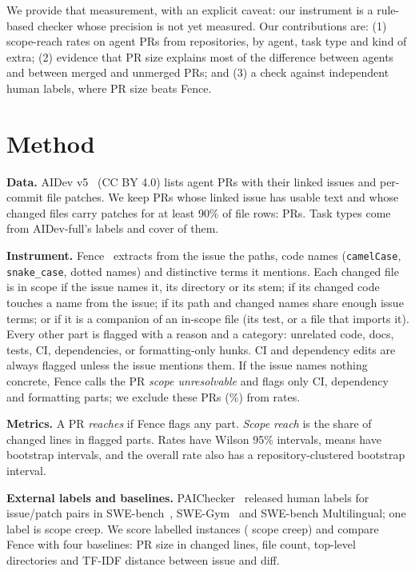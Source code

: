\documentclass[10pt,conference]{IEEEtran}
\begin{document}
We provide that measurement, with an explicit caveat: our instrument is a rule-based checker whose precision is not yet measured. Our contributions are: (1) scope-reach rates on \nCorpus{} agent PRs from \nRepos{} repositories, by agent, task type and kind of extra; (2) evidence that PR size explains most of the difference between agents and between merged and unmerged PRs; and (3) a check against independent human labels, where PR size beats Fence.

\section{Method}
\textbf{Data.} AIDev v5~\cite{li2026aidev} (CC BY 4.0) lists agent PRs with their linked issues and per-commit file patches. We keep PRs whose linked issue has usable text and whose changed files carry patches for at least 90\% of file rows: \nCorpus{} PRs. Task types come from AIDev-full's labels and cover \nTyped{} of them.

\textbf{Instrument.} Fence~\cite{fencetool} extracts from the issue the paths, code names (\texttt{camelCase}, \texttt{snake\_case}, dotted names) and distinctive terms it mentions. Each changed file is in scope if the issue names it, its directory or its stem; if its changed code touches a name from the issue; if its path and changed names share enough issue terms; or if it is a companion of an in-scope file (its test, or a file that imports it). Every other part is flagged with a reason and a category: unrelated code, docs, tests, CI, dependencies, or formatting-only hunks. CI and dependency edits are always flagged unless the issue mentions them. If the issue names nothing concrete, Fence calls the PR \emph{scope unresolvable} and flags only CI, dependency and formatting parts; we exclude these \nUnres{} PRs (\pctUnres\%) from rates.

\textbf{Metrics.} A PR \emph{reaches} if Fence flags any part. \emph{Scope reach} is the share of changed lines in flagged parts. Rates have Wilson 95\% intervals, means have bootstrap intervals, and the overall rate also has a repository-clustered bootstrap interval.

\textbf{External labels and baselines.} PAIChecker~\cite{wang2026paichecker} released human labels for issue/patch pairs in SWE-bench~\cite{jimenez2024swebench}, SWE-Gym~\cite{pan2025swegym} and SWE-bench Multilingual; one label is scope creep. We score \nPai{} labelled instances (\nPaiSC{} scope creep) and compare Fence with four baselines: PR size in changed lines, file count, top-level directories and TF-IDF distance between issue and diff.
\end{document}
